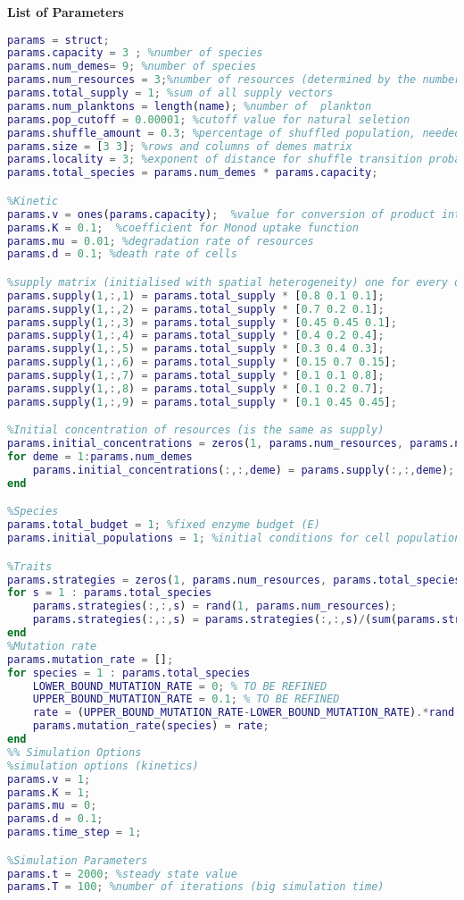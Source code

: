 
\begin{mybox}{\textbf{List of Parameters}}
\begin{lstlisting}[language = Matlab]       
%init params structure
params = struct;
params.capacity = 3	; %number of species               
params.num_demes= 9; %number of species
params.num_resources = 3;%number of resources (determined by the number of supply vectors)
params.total_supply = 1; %sum of all supply vectors
params.num_planktons = length(name); %number of  plankton
params.pop_cutoff = 0.00001; %cutoff value for natural seletion
params.shuffle_amount = 0.3; %percentage of shuffled population, needed by shuffle funtion
params.size = [3 3]; %rows and columns of demes matrix
params.locality = 3; %exponent of distance for shuffle transition probabilities
params.total_species = params.num_demes * params.capacity;

%Kinetic 
params.v = ones(params.capacity);  %value for conversion of product into biomass
params.K = 0.1;  %coefficient for Monod uptake function
params.mu = 0.01; %degradation rate of resources
params.d = 0.1; %death rate of cells

%supply matrix (initialised with spatial heterogeneity) one for every deme
params.supply(1,:,1) = params.total_supply * [0.8 0.1 0.1];
params.supply(1,:,2) = params.total_supply * [0.7 0.2 0.1];
params.supply(1,:,3) = params.total_supply * [0.45 0.45 0.1];
params.supply(1,:,4) = params.total_supply * [0.4 0.2 0.4];
params.supply(1,:,5) = params.total_supply * [0.3 0.4 0.3];
params.supply(1,:,6) = params.total_supply * [0.15 0.7 0.15];
params.supply(1,:,7) = params.total_supply * [0.1 0.1 0.8];
params.supply(1,:,8) = params.total_supply * [0.1 0.2 0.7];
params.supply(1,:,9) = params.total_supply * [0.1 0.45 0.45];

%Initial concentration of resources (is the same as supply)
params.initial_concentrations = zeros(1, params.num_resources, params.num_demes);
for deme = 1:params.num_demes
    params.initial_concentrations(:,:,deme) = params.supply(:,:,deme);
end

%Species 
params.total_budget = 1; %fixed enzyme budget (E)
params.initial_populations = 1; %initial conditions for cell population to solve ODE

%Traits
params.strategies = zeros(1, params.num_resources, params.total_species);
for s = 1 : params.total_species
    params.strategies(:,:,s) = rand(1, params.num_resources);
    params.strategies(:,:,s) = params.strategies(:,:,s)/(sum(params.strategies(:,:,s))/params.total_budget);
end
%Mutation rate
params.mutation_rate = [];
for species = 1 : params.total_species
    LOWER_BOUND_MUTATION_RATE = 0; % TO BE REFINED
    UPPER_BOUND_MUTATION_RATE = 0.1; % TO BE REFINED
    rate = (UPPER_BOUND_MUTATION_RATE-LOWER_BOUND_MUTATION_RATE).*rand + LOWER_BOUND_MUTATION_RATE;
    params.mutation_rate(species) = rate;
end
%% Simulation Options
%simulation options (kinetics)
params.v = 1;
params.K = 1;
params.mu = 0;
params.d = 0.1;
params.time_step = 1;

%Simulation Parameters
params.t = 2000; %steady state value
params.T = 100; %number of iterations (big simulation time)
\end{lstlisting}
\end{mybox}
